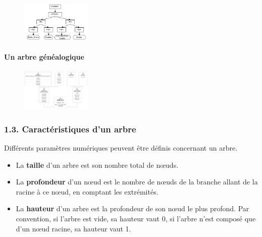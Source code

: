 \documentclass[
  a4paper,
  DIV=11,
  numbers=noendperiod]{scrartcl}
\let\oldparagraph\paragraph
\renewcommand{\paragraph}[1]{\oldparagraph{#1}\mbox{}}
\providecommand{\tightlist}{%
  \setlength{\itemsep}{0pt}\setlength{\parskip}{0pt}}\usepackage{longtable,booktabs,array}
\begin{document}
\begin{figure}

{\centering \includegraphics[width=0.3\textwidth,height=\textheight]{DOM.png}

}

\end{figure}

\hypertarget{un-arbre-guxe9nuxe9alogique}{%
\paragraph{Un arbre généalogique}\label{un-arbre-guxe9nuxe9alogique}}

\begin{figure}

{\centering \includegraphics[width=0.3\textwidth,height=\textheight]{arbre_genea.png}

}

\end{figure}

\hypertarget{caractuxe9ristiques-dun-arbre}{%
\subsubsection{1.3. Caractéristiques d'un
arbre}\label{caractuxe9ristiques-dun-arbre}}

Différents paramètres numériques peuvent être définis concernant un
arbre.

\begin{tcolorbox}[enhanced jigsaw, titlerule=0mm, opacityback=0, toptitle=1mm, opacitybacktitle=0.6, breakable, colback=white, title=\textcolor{quarto-callout-tip-color}{\faLightbulb}\hspace{0.5em}{Définitions}, bottomtitle=1mm, arc=.35mm, colbacktitle=quarto-callout-tip-color!10!white, rightrule=.15mm, bottomrule=.15mm, leftrule=.75mm, toprule=.15mm, left=2mm, coltitle=black]

\begin{itemize}
\tightlist
\item
  La \textbf{taille} d'un arbre est son nombre total de nœuds.
\item
  La \textbf{profondeur} d'un nœud est le nombre de nœuds de la branche
  allant de la racine à ce nœud, en comptant les extrémités.
\item
  La \textbf{hauteur} d'un arbre est la profondeur de son nœud le plus
  profond. Par convention, si l'arbre est vide, sa hauteur vaut 0, si
  l'arbre n'est composé que d'un nœud racine, sa hauteur vaut 1.
\end{itemize}

\end{tcolorbox}
\end{document}
